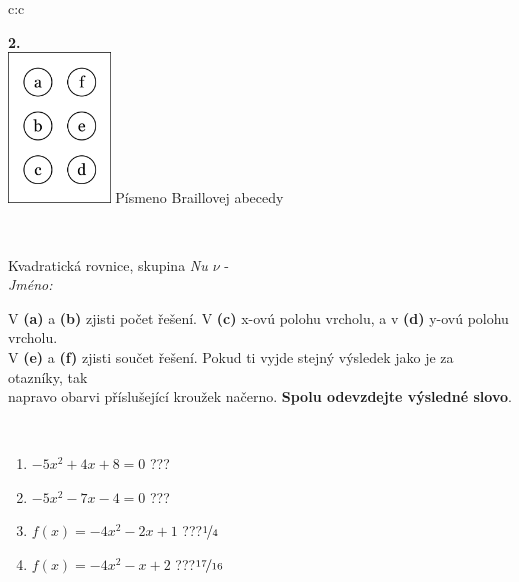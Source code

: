 \documentclass[10pt]{report}
\begin{document}
\begin{tabular}{c:c}
\begin{minipage}[c][104.5mm][t]{0.5\linewidth}
\begin{center}
\begin{minipage}{0.20\linewidth}
\begin{center}
{\Huge\bfseries 2.} \\[2mm]
\includegraphics[height=40mm]{../images/braille.png}
{\small Písmeno Braillovej abecedy}
\end{center}
\end{minipage}
\end{center}
\end{minipage}
\\ \hdashline
\begin{minipage}[c][104.5mm][t]{0.5\linewidth}
\begin{center}
\vspace{7mm}
{\huge Kvadratická rovnice, skupina \textit{Nu $\nu$} -}\\[5mm]
\textit{Jméno:}\phantom{xxxxxxxxxxxxxxxxxxxxxxxxxxxxxxxxxxxxxxxxxxxxxxxxxxxxxxxxxxxxxxxxx}\\[5mm]
\begin{minipage}{0.95\linewidth}
\begin{center}
V \textbf{(a)} a \textbf{(b)} zjisti počet řešení. V \textbf{(c)} x-ovú polohu vrcholu, a v \textbf{(d)} y-ovú polohu vrcholu.\\V \textbf{(e)} a \textbf{(f)} zjisti součet řešení. Pokud ti vyjde stejný výsledek jako je za otazníky, tak\\napravo obarvi příslušející kroužek načerno. \textbf{Spolu odevzdejte výsledné slovo}.
\end{center}
\end{minipage}
\\[1mm]
\begin{minipage}{0.79\linewidth}
\begin{center}
\begin{varwidth}{\linewidth}
\begin{enumerate}
\Large
\item $-5x^2+4x+8=0$\quad \dotfill\; ???\;\dotfill {}
\item $-5x^2-7x-4=0$\quad \dotfill\; ???\;\dotfill {}
\item $f(x)=-4x^2-2x+1$\quad \dotfill\; ???\;\dotfill \quad $\nicefrac{1}{4}$
\item $f(x)=-4x^2-x+2$\quad \dotfill\; ???\;\dotfill \quad $\nicefrac{17}{16}$

\end{enumerate}
\end{varwidth}
\end{center}
\end{minipage}
\end{center}
\end{minipage}
\end{tabular}
\end{document}
